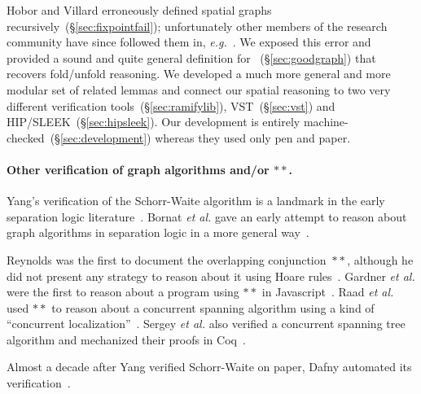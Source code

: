 Hobor and Villard erroneously defined spatial graphs recursively~(\S\ref{sec:fixpointfail}); unfortunately other members of the research community have since followed them in, \emph{e.g.}~\cite{RaadVG15}.  We exposed this error and provided a sound and quite general definition for ~(\S\ref{sec:goodgraph}) that recovers fold/unfold reasoning.  We developed a much more general and more modular set of related lemmas and connect our spatial reasoning to two very different verification tools~(\S\ref{sec:ramifylib}), VST~(\S\ref{sec:vst}) and HIP/SLEEK~(\S\ref{sec:hipsleek}).  Our development is entirely machine-checked~(\S\ref{sec:development}) whereas they used only pen and paper.
\fi

\paragraph{Other verification of graph algorithms and/or $**$.}
Yang's verification of the Schorr-Waite algorithm is a landmark in the early separation logic literature~\cite{hongseok:phd}.  Bornat \emph{et al.} gave an early attempt to reason about graph algorithms in separation logic in a more general way~\cite{bornat:aliasing04}.

Reynolds was the first to document the overlapping conjunction~$**$, although he did not present any strategy to reason about it using Hoare rules~\cite{rey-slnotes}.  Gardner \emph{et al.} were the first to reason about a program using $**$ in Javascript~\cite{GardnerMS12}.  Raad \emph{et al.} used $**$ to reason about a concurrent spanning algorithm using a kind of ``concurrent localization''~\cite{RaadVG15}.  Sergey \emph{et al.} also verified a concurrent spanning tree algorithm and mechanized their proofs in Coq~\cite{ilya-graphs}.

Almost a decade after Yang verified Schorr-Waite on paper, Dafny automated its verification~\cite{Leino10}.


